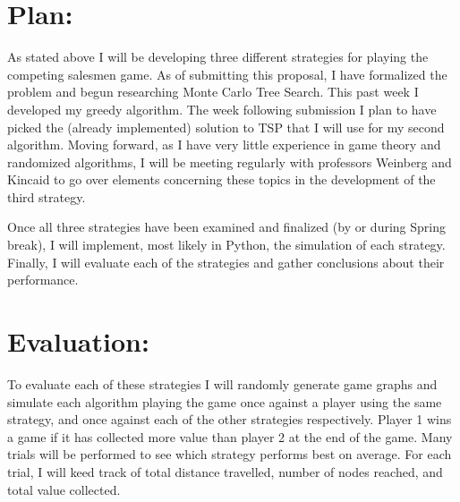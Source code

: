 \documentclass[12pt]{article}%
\begin{document}
	\section*{Plan:}
	
	As stated above I will be developing three different strategies for playing the competing salesmen game. As of submitting this proposal, I have formalized the problem and begun researching Monte Carlo Tree Search. This past week I developed my greedy algorithm. The week following submission I plan to have picked the (already implemented) solution to TSP that I will use for my second algorithm. Moving forward, as I have very little experience in game theory and randomized algorithms, I will be meeting regularly with professors Weinberg and Kincaid to go over elements concerning these topics in the development of the third strategy.\par 
	Once all three strategies have been examined and finalized (by or during Spring break), I will implement, most likely in Python, the simulation of each strategy. Finally, I will evaluate each of the strategies and gather conclusions about their performance.
	
	\section*{Evaluation:}
	
	To evaluate each of these strategies I will randomly generate game graphs and simulate each algorithm playing the game once against a player using the same strategy, and once against each of the other strategies respectively. Player 1 wins a game if it has collected more value than player 2 at the end of the game. Many trials will be performed to see which strategy performs best on average. For each trial, I will keed track of total distance travelled, number of nodes reached, and total value collected.
	
\end{document}

